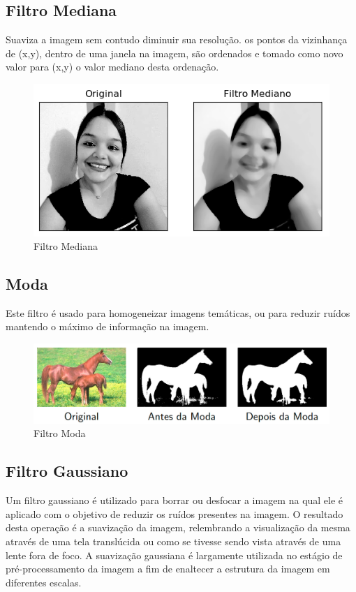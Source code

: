 		\lstset{language=c++}
		{\tiny }
	
	\subsection{Filtro Mediana}
		Suaviza a imagem sem contudo diminuir sua resolução. os pontos da vizinhança de (x,y), dentro de uma janela na imagem, são ordenados e tomado como novo valor para (x,y) o valor mediano desta ordenação.
		
		\begin{figure}[!htb]
			\centering
			\includegraphics[width=\columnwidth]{img/16-mediana.png}
			\caption{Filtro Mediana}
		\end{figure}
		
		\lstset{language=python}
		{\tiny }
		
	\subsection{Moda}
		Este filtro é usado para homogeneizar imagens temáticas, ou para reduzir ruídos mantendo o máximo de informação na imagem.
		
		\begin{figure}[!htb]
			\centering
			\includegraphics[width=\columnwidth]{img/18-moda.jpg}
			\caption{Filtro Moda}
		\end{figure}
		
	\subsection{Filtro Gaussiano}
		Um filtro gaussiano é utilizado para borrar ou desfocar a imagem na qual ele é aplicado com o objetivo de reduzir os ruídos presentes na imagem.  O resultado desta operação é a suavização da imagem, relembrando a visualização da mesma através de uma tela translúcida ou como se tivesse sendo vista através de uma lente fora de foco. A suavização gaussiana é largamente utilizada no estágio de pré-processamento da imagem a fim de enaltecer a estrutura da imagem em diferentes escalas.
		
